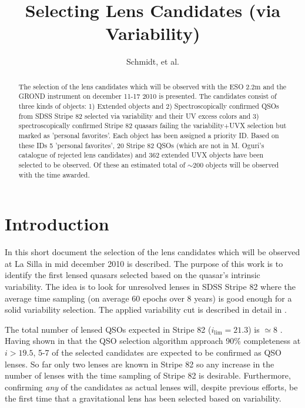 \documentclass[a4paper,11pt]{article}
\begin{document}
\title{Selecting Lens Candidates (via Variability)}


\author{Schmidt, et al.}



\maketitle

\begin{abstract}

The selection of the lens candidates which will be observed with the ESO 2.2m and the GROND instrument on december 11-17 2010 is presented. The candidates consist of three kinds of objects: 1) Extended objects and 2) Spectroscopically confirmed QSOs from SDSS Stripe 82  selected via variability and their UV excess colors and 3) spectroscopically confirmed Stripe 82 quasars failing the variability+UVX selection but marked as 'personal favorites'. Each object has been assigned a priority ID. Based on these IDs 5 'personal favorites', 20 Stripe 82 QSOs (which are not in M. Oguri's catalogue of rejected lens candidates) and 362 extended UVX objects have been selected to be observed. Of these an estimated total of $\sim$200 objects will be observed with the time awarded.
\end{abstract}

\section{Introduction}

In this short document the selection of the lens candidates which will be observed at La Silla in mid december 2010 is described. The purpose of this work is to identify the first lensed quasars selected based on the quasar's intrinsic variability. The idea is to look for unresolved lenses in SDSS Stripe 82 where the average time sampling (on average 60 epochs over 8 years) is good enough for a solid variability selection. The applied variability cut is described in detail in \cite{schmidt10}.

The total number of lensed QSOs expected in Stripe 82 ($i_\textrm{lim}=21.3$) is $\simeq 8$ \cite{oguri10}. Having shown in \cite{schmidt10} that the QSO selection algorithm approach 90\% completeness at $i > 19.5$, 5-7 of the selected candidates are expected to be confirmed as QSO lenses. So far only two lenses are known in Stripe 82 \citep{lacki08,jackson08} so any increase in the number of lenses with the time sampling of Stripe 82 is desirable. Furthermore, confirming {\it any} of the candidates as actual lenses will, despite previous efforts, be the first time that a gravitational lens has been selected based on variability.
\end{document}
